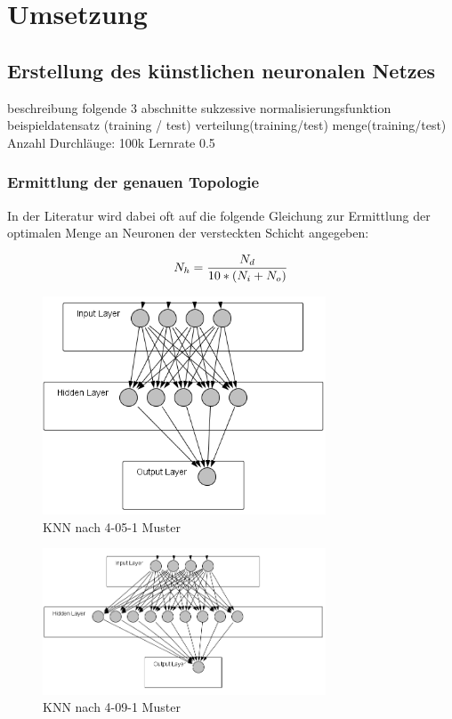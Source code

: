 \chapter{Umsetzung} %
\section{Erstellung des künstlichen neuronalen Netzes} %

beschreibung folgende 3 abschnitte sukzessive
normalisierungsfunktion
beispieldatensatz (training / test)
verteilung(training/test)
menge(training/test)
Anzahl Durchläuge: 100k
Lernrate 0.5


\subsection{Ermittlung der genauen Topologie} %
In der Literatur wird dabei oft auf die folgende Gleichung zur Ermittlung der optimalen  Menge an Neuronen der versteckten Schicht angegeben:

\begin{equation}\formelentry{Optimale Anzahl Neuronen in der versteckten Schicht}
  N_h = \frac{N_d}{10*(N_i+N_o)}
\end{equation}


\begin{figure}[htbp]
\centering
		\includegraphics[width=0.75\textwidth]{4-5-1.PNG}
	\caption{KNN nach 4-05-1 Muster}
	\label{fig:KNN nach 4-05-1 Muster}
\end{figure}


\begin{figure}[H]
\centering
		\includegraphics[width=0.75\textwidth]{4-9-1.PNG}
	\caption{KNN nach 4-09-1 Muster}
	\label{fig:KNN nach 4-09-1 Muster}
\end{figure}



